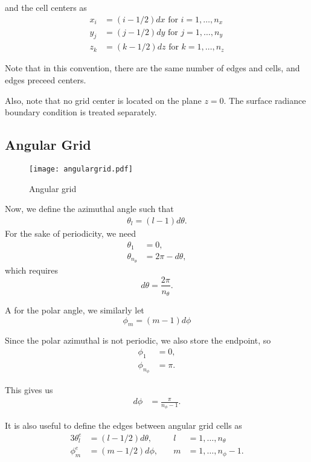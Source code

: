 and the cell centers as
\begin{align}
  x_i &= (i-1/2)dx \mbox{ for } i=1,\ldots,n_x \\
  y_j &= (j-1/2)dy \mbox{ for } j=1,\ldots,n_y \\
  z_k &= (k-1/2)dz \mbox{ for } k=1,\ldots,n_z
\end{align}

Note that in this convention, there are the same number of edges and cells,
and edges preceed centers.

Also, note that no grid center is located on the plane $z=0$.
The surface radiance boundary condition is treated separately.

\subsection{Angular Grid}
\begin{figure}[H]
  \centering
  \texttt{[image: angulargrid.pdf]}
  \caption{Angular grid}
  \label{fig:angular_grid}
\end{figure}

Now, we define the azimuthal angle such that
\begin{align}
  \theta_l = (l-1)d\theta.
\end{align}
For the sake of periodicity, we need
\begin{align}
  \theta_1 &= 0, \\
  \theta_{n_\theta} &= 2\pi-d\theta,
\end{align}
which requires
\begin{equation}
  d\theta = \frac{2\pi}{n_\theta}.
\end{equation}

A for the polar angle, we similarly let
\begin{equation}
  \phi_m = (m-1)d\phi
\end{equation}

Since the polar azimuthal is not periodic, we also store the endpoint, so
\begin{align}
  \phi_1 &= 0, \\
  \phi_{n_\phi} &= \pi.
\end{align}

This gives us
\begin{align}
  d\phi &= \frac{\pi}{n_\phi-1}.
\end{align}

It is also useful to define the edges between angular grid cells as
\begin{alignat}{3}
  \theta_l^e &= (l-1/2) d\theta, &\quad l&=1,\ldots,n_\theta \\
  \phi_m^e &= (m-1/2) d\phi, &\quad m&=1,\ldots,n_\phi-1.
\end{alignat}

